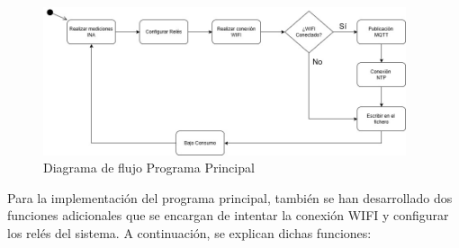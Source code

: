 \begin{figure}[H]
    \centering
    \includegraphics[width=0.95\textwidth]{images/3-software/3-3-programaprincipal/DiagramaDeFlujoPOWER.jpg}
    \caption{Diagrama de flujo Programa Principal}
    \label{fig:3-3-1-DiagramaFlujo}
\end{figure}

Para la implementación del programa principal, también se han desarrollado dos funciones adicionales que se encargan de intentar la conexión WIFI y configurar los relés del sistema. A continuación, se explican dichas funciones:

